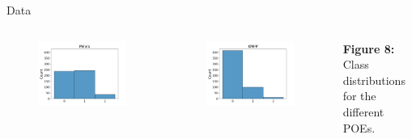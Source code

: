 \begin{frame}[fragile]{Data}
\begin{columns}[c]
\begin{columns}
      \begin{figure}
        \centering
        \includegraphics[width=\textwidth]{files/figs/met/pelvis-label-hist.png}
      \end{figure}

      \begin{figure}
        \centering
        \includegraphics[width=\textwidth]{files/figs/met/kmfp-label-hist.png}
      \end{figure}
    \end{columns}

    {\scriptsize\newline\textbf{Figure 8:} Class distributions for the different POEs.}


\end{columns}
\end{frame}

